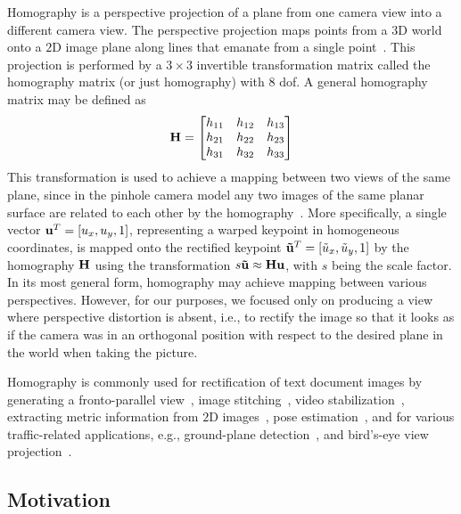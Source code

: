 Homography is a perspective projection of a plane from one camera view into a different camera view. The perspective projection maps points from a $3$D world onto a $2$D image plane along lines that emanate from a single point~\cite{geetha2013automatic, bousaid2020perspective}. This projection is performed by a $3 \times 3$ invertible transformation matrix called the homography matrix (or just homography) with $8$ \gls{dof}. A general homography matrix may be defined as
\begin{equation}
    \label{eq:HomographyMatrix}
    \mathbf{H} =
    \begin{bmatrix}
        h_{11} & h_{12} & h_{13}\\
        h_{21} & h_{22} & h_{23}\\
        h_{31} & h_{32} & h_{33}
    \end{bmatrix}
\end{equation}
This transformation is used to achieve a mapping between two views of the same plane, since in the pinhole camera model any two images of the same planar surface are related to each other by the homography~\cite{hartley2003multiple, hartley1997defense}. More specifically, a single vector ${\mathbf{u}}^T = \left[ {u_x, u_y, 1} \right]$, representing a warped keypoint in homogeneous coordinates, is mapped onto the rectified keypoint  ${\mathbf{\tilde{u}}}^T = \left[ {\tilde{u}_x, \tilde{u}_y, 1} \right]$ by the homography $\mathbf{H}$ using the transformation $s \mathbf{\tilde{u}} \approx \mathbf{H} \mathbf{u}$, with $s$ being the scale factor. In its most general form, homography may achieve mapping between various perspectives. However, for our purposes, we focused only on producing a view where perspective distortion is absent, i.e., to rectify the image so that it looks as if the camera was in an orthogonal position with respect to the desired plane in the world when taking the picture.

Homography is commonly used for rectification of text document images by generating a fronto-parallel view~\cite{lu2005perspective, miao2006perspective}, image stitching~\cite{adel2014image, gao2011constructing}, video stabilization~\cite{liu2015smooth}, extracting metric information from $2$D images~\cite{zhang2000flexible}, pose estimation~\cite{circularmarkerposeestim}, and for various traffic-related applications, e.g., ground-plane detection~\cite{arrospide2010homography}, and bird's-eye view projection~\cite{luo2010low}.

\subsection{Motivation}

